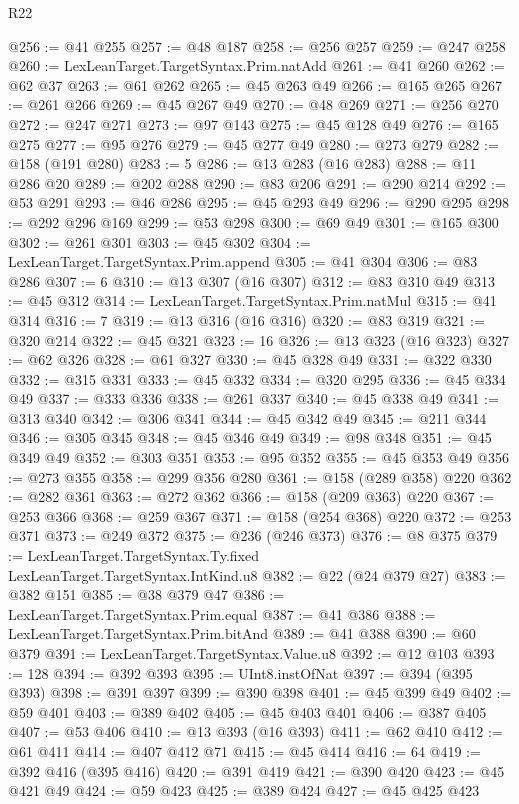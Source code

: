 \begin{lexlean}{R22}
\begin{coremodule}
@256 := @41 @255
@257 := @48 @187
@258 := @256 @257
@259 := @247 @258
@260 := LexLeanTarget.TargetSyntax.Prim.natAdd
@261 := @41 @260
@262 := @62 @37
@263 := @61 @262
@265 := @45 @263 @49
@266 := @165 @265
@267 := @261 @266
@269 := @45 @267 @49
@270 := @48 @269
@271 := @256 @270
@272 := @247 @271
@273 := @97 @143
@275 := @45 @128 @49
@276 := @165 @275
@277 := @95 @276
@279 := @45 @277 @49
@280 := @273 @279
@282 := @158 (@191 @280)
@283 := 5
@286 := @13 @283 (@16 @283)
@288 := @11 @286 @20
@289 := @202 @288
@290 := @83 @206
@291 := @290 @214
@292 := @53 @291
@293 := @46 @286
@295 := @45 @293 @49
@296 := @290 @295
@298 := @292 @296 @169
@299 := @53 @298
@300 := @69 @49
@301 := @165 @300
@302 := @261 @301
@303 := @45 @302
@304 := LexLeanTarget.TargetSyntax.Prim.append
@305 := @41 @304
@306 := @83 @286
@307 := 6
@310 := @13 @307 (@16 @307)
@312 := @83 @310 @49
@313 := @45 @312
@314 := LexLeanTarget.TargetSyntax.Prim.natMul
@315 := @41 @314
@316 := 7
@319 := @13 @316 (@16 @316)
@320 := @83 @319
@321 := @320 @214
@322 := @45 @321
@323 := 16
@326 := @13 @323 (@16 @323)
@327 := @62 @326
@328 := @61 @327
@330 := @45 @328 @49
@331 := @322 @330
@332 := @315 @331
@333 := @45 @332
@334 := @320 @295
@336 := @45 @334 @49
@337 := @333 @336
@338 := @261 @337
@340 := @45 @338 @49
@341 := @313 @340
@342 := @306 @341
@344 := @45 @342 @49
@345 := @211 @344
@346 := @305 @345
@348 := @45 @346 @49
@349 := @98 @348
@351 := @45 @349 @49
@352 := @303 @351
@353 := @95 @352
@355 := @45 @353 @49
@356 := @273 @355
@358 := @299 @356 @280
@361 := @158 (@289 @358) @220
@362 := @282 @361
@363 := @272 @362
@366 := @158 (@209 @363) @220
@367 := @253 @366
@368 := @259 @367
@371 := @158 (@254 @368) @220
@372 := @253 @371
@373 := @249 @372
@375 := @236 (@246 @373)
@376 := @8 @375
@379 := LexLeanTarget.TargetSyntax.Ty.fixed LexLeanTarget.TargetSyntax.IntKind.u8
@382 := @22 (@24 @379 @27)
@383 := @382 @151
@385 := @38 @379 @47
@386 := LexLeanTarget.TargetSyntax.Prim.equal
@387 := @41 @386
@388 := LexLeanTarget.TargetSyntax.Prim.bitAnd
@389 := @41 @388
@390 := @60 @379
@391 := LexLeanTarget.TargetSyntax.Value.u8
@392 := @12 @103
@393 := 128
@394 := @392 @393
@395 := UInt8.instOfNat
@397 := @394 (@395 @393)
@398 := @391 @397
@399 := @390 @398
@401 := @45 @399 @49
@402 := @59 @401
@403 := @389 @402
@405 := @45 @403 @401
@406 := @387 @405
@407 := @53 @406
@410 := @13 @393 (@16 @393)
@411 := @62 @410
@412 := @61 @411
@414 := @407 @412 @71
@415 := @45 @414
@416 := 64
@419 := @392 @416 (@395 @416)
@420 := @391 @419
@421 := @390 @420
@423 := @45 @421 @49
@424 := @59 @423
@425 := @389 @424
@427 := @45 @425 @423

\end{coremodule}
\end{lexlean}

